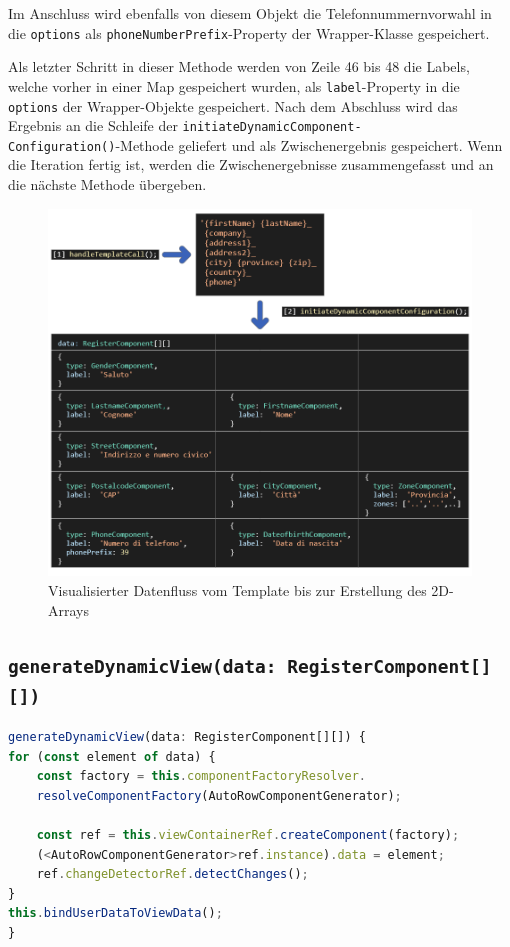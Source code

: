 Im Anschluss wird ebenfalls von diesem Objekt die Telefonnummernvorwahl in die \texttt{opti\-ons} als \texttt{phoneNumberPrefix}-Property der Wrapper-Klasse gespeichert.

Als letzter Schritt in dieser Methode werden von Zeile 46 bis 48 die Labels, welche vorher in einer Map gespeichert wurden, als \texttt{label}-Property in die \texttt{options} der Wrapper-Objekte gespeichert. 
\newpage
Nach dem Abschluss wird das Ergebnis an die Schleife der \texttt{initiateDynamicComponent-\\Configuration()}-Methode geliefert und als Zwischenergebnis gespeichert. Wenn die Iteration fertig ist, werden die Zwischenergebnisse zusammengefasst und an die nächste Methode übergeben.

\begin{figure}[H]
	\centerline{
		\includegraphics[width=1\textwidth, frame]{./grafiken/RF_Visualisierter Ablauf_1.png}
	}
	\vskip0pt
	\caption{Visualisierter Datenfluss vom Template bis zur Erstellung des 2D-Arrays}
\end{figure}

\subsection{\texttt{generateDynamicView(data: RegisterComponent[][])}}

\begin{lstlisting}[caption={Die \texttt{generateDynamicView()}-Methode}, language=JavaScript,label={lst:generateDynamicView}]
generateDynamicView(data: RegisterComponent[][]) {
for (const element of data) {
	const factory = this.componentFactoryResolver.
	resolveComponentFactory(AutoRowComponentGenerator);
	
	const ref = this.viewContainerRef.createComponent(factory);
	(<AutoRowComponentGenerator>ref.instance).data = element;
	ref.changeDetectorRef.detectChanges();
}
this.bindUserDataToViewData();
}
\end{lstlisting}

